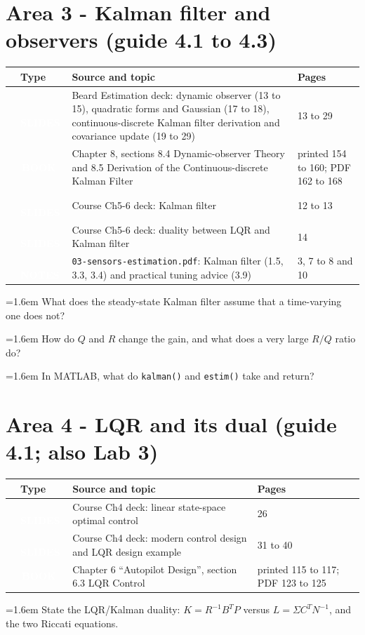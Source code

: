 \documentclass[10pt,a4paper]{article}
\newcommand{\cb}{\raisebox{-0.35ex}{\Large$\square$}}
\newcommand{\cbx}{\raisebox{-0.35ex}{\Large$\boxtimes$}}
\newcommand{\srctag}[2]{\colorbox{#1}{\textcolor{white}{\textbf{\scriptsize\,#2\,}}}}
\newcommand{\SLIDES}{\srctag{slides}{SLIDES}}
\newcommand{\BOOK}{\srctag{book}{BOOK}}
\newcommand{\NOTES}{\srctag{notes}{NOTES}}
\newcommand{\chkx}[1]{\par\noindent\hangindent=1.6em\hangafter=1 \cbx\hspace{0.6em}#1}
\begin{document}
\section*{Area 3 - Kalman filter and observers \hfill\normalfont\small (guide 4.1 to 4.3)}

\begin{tabularx}{\textwidth}{@{}C T X l@{}}
\toprule
\cb & Type & Source and topic & Pages\\
\midrule
\cbx & \SLIDES & Beard Estimation deck: dynamic observer (13 to 15), quadratic forms and Gaussian (17 to 18), continuous-discrete Kalman filter derivation and covariance update (19 to 29) & 13 to 29\\
\cbx & \BOOK & Chapter 8, sections 8.4 Dynamic-observer Theory and 8.5 Derivation of the Continuous-discrete Kalman Filter & printed 154 to 160; PDF 162 to 168\\
\cbx & \SLIDES & Course Ch5-6 deck: Kalman filter & 12 to 13\\
\cbx & \SLIDES & Course Ch5-6 deck: duality between LQR and Kalman filter & 14\\
\cb & \NOTES & \texttt{03-sensors-estimation.pdf}: Kalman filter (1.5, 3.3, 3.4) and practical tuning advice (3.9) & 3, 7 to 8 and 10\\
\bottomrule
\end{tabularx}
\begin{selfcheck}
\chkx{What does the steady-state Kalman filter assume that a time-varying one does not?}
\chkx{How do $Q$ and $R$ change the gain, and what does a very large $R/Q$ ratio do?}
\chkx{In MATLAB, what do \texttt{kalman()} and \texttt{estim()} take and return?}
\end{selfcheck}

\section*{Area 4 - LQR and its dual \hfill\normalfont\small (guide 4.1; also Lab 3)}

\begin{tabularx}{\textwidth}{@{}C T X l@{}}
\toprule
\cb & Type & Source and topic & Pages\\
\midrule
\cbx & \SLIDES & Course Ch4 deck: linear state-space optimal control & 26\\
\cbx & \SLIDES & Course Ch4 deck: modern control design and LQR design example & 31 to 40\\
\cbx & \BOOK & Chapter 6 ``Autopilot Design'', section 6.3 LQR Control & printed 115 to 117; PDF 123 to 125\\
\bottomrule
\end{tabularx}
\begin{selfcheck}
\chkx{State the LQR/Kalman duality: $K=R^{-1}B^{T}P$ versus $L=\Sigma C^{T}N^{-1}$, and the two Riccati equations.}
\end{selfcheck}
\end{document}
